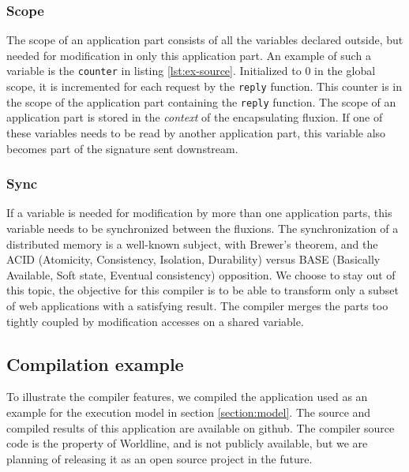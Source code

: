 \subsubsection{Scope}

The scope of an application part consists of all the variables declared outside, but needed for modification in only this application part.
An example of such a variable is the \texttt{counter} in listing \ref{lst:ex-source}.
Initialized to 0 in the global scope, it is incremented for each request by the \texttt{reply} function.
This counter is in the scope of the application part containing the \texttt{reply} function.
The scope of an application part is stored in the \textit{context} of the encapsulating fluxion.
If one of these variables needs to be read by another application part, this variable also becomes part of the signature sent downstream.

\subsubsection{Sync}

If a variable is needed for modification by more than one application parts, this variable needs to be synchronized between the fluxions.
The synchronization of a distributed memory is a well-known subject, with Brewer's theorem\cite{Gilbert2002}\cite{codahale2010}, and the ACID (Atomicity, Consistency, Isolation, Durability) versus BASE (Basically Available, Soft state, Eventual consistency) opposition\cite{Fox1997}.
We choose to stay out of this topic, the objective for this compiler is to be able to transform only a subset of web applications with a satisfying result.
The compiler merges the parts too tightly coupled by modification accesses on a shared variable.

\subsection{Compilation example} \label{section:example}

To illustrate the compiler features, we compiled the application used as an example for the execution model in section \ref{section:model}.
The source and compiled results of this application are available on github\cite{flx-example}.
The compiler source code is the property of Worldline, and is not publicly available, but we are planning of releasing it as an open source project in the future.


